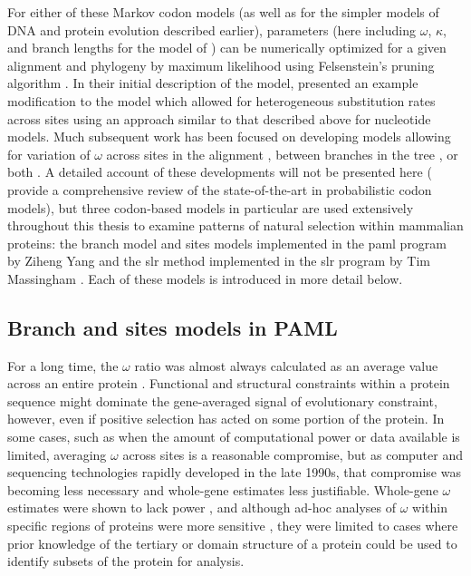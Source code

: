 For either of these Markov codon models (as well as for the simpler
models of DNA and protein evolution described earlier), parameters
(here including $\omega$, $\kappa$, and branch lengths for the model
of \citet{Goldman1994a}) can be numerically optimized for a given
alignment and phylogeny by maximum likelihood using Felsenstein's
pruning algorithm \citep{Felsenstein1981a,Goldman1994a,Yang2000c}. In
their initial description of the model, \citet{Goldman1994a} presented
an example modification to the model which allowed for heterogeneous
substitution rates across sites using an approach similar to that
described above for nucleotide models. Much subsequent work has been
focused on developing models allowing for variation of $\omega$ across
sites in the alignment
\citep{Nielsen1998,Yang2000CodonSubstitution,Yang2002,
  Wong2004,Yang2005Bayes,Massingham2005}, between branches in the tree
\citep{Yang1998a}, or both \citep{Yang2002b,Zhang2005}.  A detailed
account of these developments will not be presented here
(\citet{Anisimova2009} provide a comprehensive review of the
state-of-the-art in probabilistic codon models), but three codon-based
models in particular are used extensively throughout this thesis to
examine patterns of natural selection within mammalian proteins: the
branch model and sites models implemented in the \ac{paml} program by
Ziheng Yang \citep{Yang2007} and the \ac{slr} method implemented
in the \ac{slr} program by Tim Massingham \citep{Massingham2005}. Each
of these models is introduced in more detail below.

\subsection{Branch and sites models in PAML}

For a long time, the $\omega$ ratio was almost always calculated as an
average value across an entire protein \citep{Sharp1997}. Functional
and structural constraints within a protein sequence might dominate
the gene-averaged signal of evolutionary constraint, however, even if
positive selection has acted on some portion of the protein. In some
cases, such as when the amount of computational power or data
available is limited, averaging $\omega$ across sites is a reasonable
compromise, but as computer and sequencing technologies rapidly
developed in the late 1990s, that compromise was becoming less
necessary and whole-gene estimates less justifiable. Whole-gene
$\omega$ estimates were shown to lack power \citep{Endo1996}, and
although ad-hoc analyses of $\omega$ within specific regions of proteins
were more sensitive \citep{Hughes1988}, they were limited to cases
where prior knowledge of the tertiary or domain structure of a protein
could be used to identify subsets of the protein for analysis.

